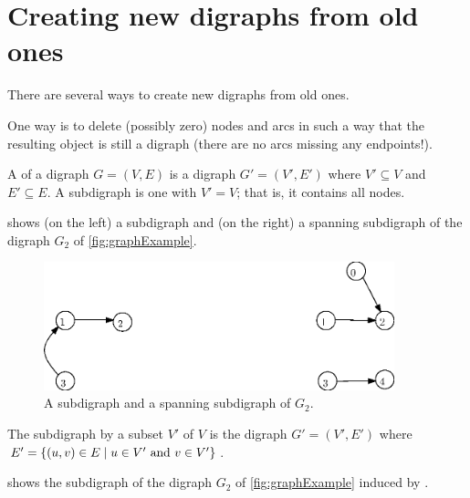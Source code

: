 \section{Creating new digraphs from old ones}

There are several ways to create new digraphs from old ones.

One way is to delete (possibly zero) nodes and arcs in such a way that the 
resulting object is still a digraph (there are no arcs missing any
endpoints!).

\begin{Definition}
A  of a digraph $G = (V, E)$ is a digraph $G' = (V', E')$ 
where $V'\subseteq V$ and $E'\subseteq E$. 
A  subdigraph is one with $V'=V$; that is, it contains all nodes.
\end{Definition}

\begin{Example}
 shows (on the left) a subdigraph and (on the right) 
a spanning subdigraph of the digraph $G_2$ of \cref{fig:graphExample}.
\end{Example}

\begin{figure}[h]
\begin{center}
\includegraphics[width=4in]{figs/wSub+Span.eps}
\end{center}
\caption{A subdigraph and a spanning subdigraph of $G_2$.}
\label{fig:sub+span}
\end{figure}

\begin{Definition}
The subdigraph  by a subset $V'$ of $V$ is the digraph
$G' = (V', E')$ where $E' = \mbox{$\{(u, v) \in E \mid u \in V' \mbox{ and } v\in V'\}$}$.
\end{Definition}

\begin{Example}
 shows the subdigraph of the  digraph $G_2$ of \cref{fig:graphExample} induced by 
.
\end{Example}

